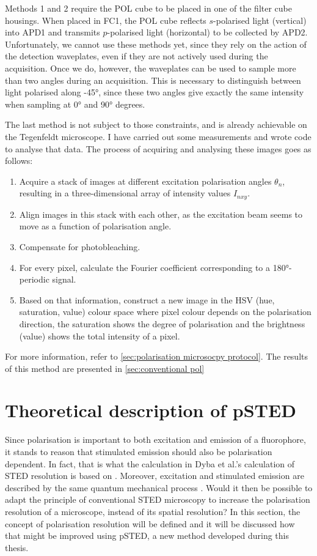 Methods 1 and 2 require the POL cube to be placed in one of the filter cube housings. When placed in FC1, the POL cube reflects $ s $-polarised light (vertical) into APD1 and transmits $ p $-polarised light (horizontal) to be collected by APD2. Unfortunately, we cannot use these methods yet, since they rely on the action of the detection waveplates, even if they are not actively used during the acquisition. Once we do, however, the waveplates can be used to sample more than two angles during an acquisition. This is necessary to distinguish between light polarised along \ang{+-45}, since these two angles give exactly the same intensity when sampling at \ang{0} and \ang{90} degrees.

The last method is not subject to those constraints, and is already achievable on the Tegenfeldt microscope. I have carried out some measurements and wrote code to analyse that data. The process of acquiring and analysing these images goes as follows:
\begin{enumerate}
	\item Acquire a stack of images at different excitation polarisation angles $ \theta_n $, resulting in a three-dimensional array of intensity values $ I_{nxy} $.
	\item Align images in this stack with each other, as the excitation beam seems to move as a function of polarisation angle.
	\item Compensate for photobleaching.
	\item For every pixel, calculate the Fourier coefficient corresponding to a \ang{180}-periodic signal.
	\item Based on that information, construct a new image in the HSV (hue, saturation, value) colour space where pixel colour depends on the polarisation direction, the saturation shows the degree of polarisation and the brightness (value) shows the total intensity of a pixel. 

\end{enumerate}

For more information, refer to \autoref{sec:polarisation microsocpy protocol}. The results of this method are presented in \autoref{sec:conventional pol}

\section{Theoretical description of pSTED}
\label{sec:psted theory}

Since polarisation is important to both excitation and emission of a fluorophore, it stands to reason that stimulated emission should also be polarisation dependent. In fact, that is what the calculation in Dyba et al.'s calculation of STED resolution is based on \cite{Harke2008, Dyba2005}. Moreover, excitation and stimulated emission are described by the same quantum mechanical process \cite{Foot}.
Would it then be possible to adapt the principle of conventional STED microscopy to increase the polarisation resolution of a microscope, instead of its spatial resolution? In this section, the concept of polarisation resolution will be defined and it will be discussed how that might be improved using pSTED, a new method developed during this thesis.

